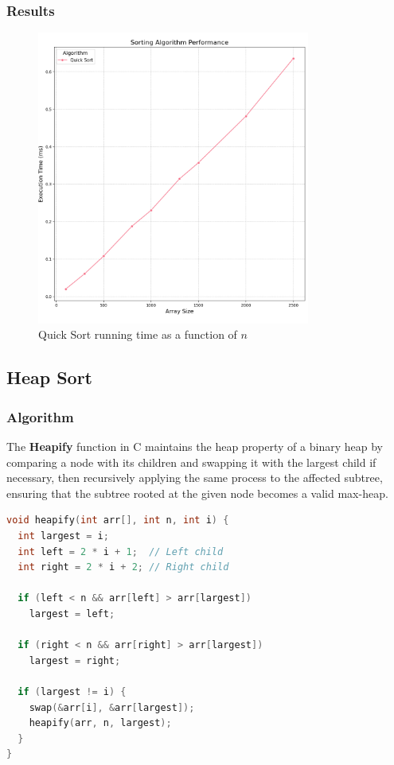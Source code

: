 \documentclass{article}
\begin{document}
\subsubsection{Results}
\begin{figure}[H]
	\includegraphics[width=0.8\textwidth]{images/quick_sort.png}
	\caption{Quick Sort running time as a function of $n$}
\end{figure}


\subsection{Heap Sort}

\subsubsection{Algorithm}
The \textbf{Heapify} function in C maintains the heap property of a binary heap by comparing a node with its children and swapping it with the largest child if necessary, then recursively applying the same process to the affected subtree, ensuring that the subtree rooted at the given node becomes a valid max-heap.

\newpage
\begin{lstlisting}[language=C, caption=Heapify implementation]
void heapify(int arr[], int n, int i) {
  int largest = i;
  int left = 2 * i + 1;  // Left child
  int right = 2 * i + 2; // Right child

  if (left < n && arr[left] > arr[largest])
    largest = left;

  if (right < n && arr[right] > arr[largest])
    largest = right;

  if (largest != i) {
    swap(&arr[i], &arr[largest]);
    heapify(arr, n, largest);
  }
}
\end{lstlisting}
\end{document}
